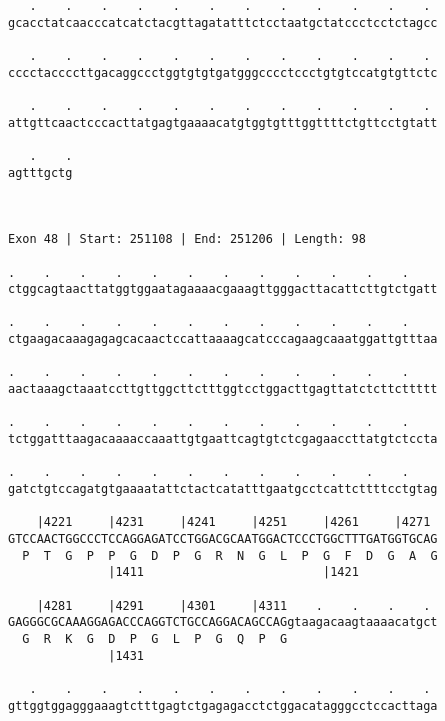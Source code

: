 \documentclass{article}
\begin{document}
\begin{Verbatim}
   .    .    .    .    .    .    .    .    .    .    .    . 
gcacctatcaacccatcatctacgttagatatttctcctaatgctatccctcctctagcc
                                                            
   .    .    .    .    .    .    .    .    .    .    .    . 
cccctaccccttgacaggccctggtgtgtgatgggcccctccctgtgtccatgtgttctc
                                                            
   .    .    .    .    .    .    .    .    .    .    .    . 
attgttcaactcccacttatgagtgaaaacatgtggtgtttggttttctgttcctgtatt
                                                            
   .    .
agtttgctg
         
         
 
Exon 48 | Start: 251108 | End: 251206 | Length: 98
 
.    .    .    .    .    .    .    .    .    .    .    .    
ctggcagtaacttatggtggaatagaaaacgaaagttgggacttacattcttgtctgatt
                                                            
.    .    .    .    .    .    .    .    .    .    .    .    
ctgaagacaaagagagcacaactccattaaaagcatcccagaagcaaatggattgtttaa
                                                            
.    .    .    .    .    .    .    .    .    .    .    .    
aactaaagctaaatccttgttggcttctttggtcctggacttgagttatctcttcttttt
                                                            
.    .    .    .    .    .    .    .    .    .    .    .    
tctggatttaagacaaaaccaaattgtgaattcagtgtctcgagaaccttatgtctccta
                                                            
.    .    .    .    .    .    .    .    .    .    .    .    
gatctgtccagatgtgaaaatattctactcatatttgaatgcctcattcttttcctgtag
                                                            
    |4221     |4231     |4241     |4251     |4261     |4271 
GTCCAACTGGCCCTCCAGGAGATCCTGGACGCAATGGACTCCCTGGCTTTGATGGTGCAG
  P  T  G  P  P  G  D  P  G  R  N  G  L  P  G  F  D  G  A  G
              |1411                         |1421           
  
    |4281     |4291     |4301     |4311    .    .    .    . 
GAGGGCGCAAAGGAGACCCAGGTCTGCCAGGACAGCCAGgtaagacaagtaaaacatgct
  G  R  K  G  D  P  G  L  P  G  Q  P  G                     
              |1431                                         
  
   .    .    .    .    .    .    .    .    .    .    .    . 
gttggtggagggaaagtctttgagtctgagagacctctggacatagggcctccacttaga
                                                            

\end{Verbatim}
\end{document}
